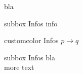 \documentclass[10pt,a4paper]{article}
\begin{document}
\begin{multicols}{3}
\begin{textbox}{bla}
\begin{multibox}{3} %
\begin{subbox}{subbox}{ Infos}
info
\end{subbox}
\begin{subbox}{customcolor}{ Infos}
$p \to q$
\end{subbox}
\begin{subbox}{subbox}{ Infos}
bla \\
more text
\end{subbox}
\end{multibox}

\end{textbox}


\AtNextBibliography{\footnotesize}
\printbibliography  
\end{multicols}
\end{document}
